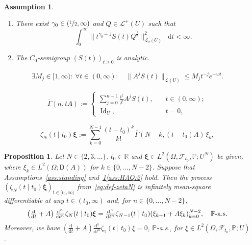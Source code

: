 \documentclass[10pt,a4paper]{amsart}
\newtheorem{assumption}{Assumption}
\newtheorem{proposition}{Proposition}
\newcommand{\bbP}{\mathbb{P}}
\newcommand{\bbR}{\mathbb{R}}
\newcommand{\cF}{\mathcal{F}}
\newcommand{\id}{\operatorname{Id}}
\newcommand{\norm}[2]{     \| #1       \|_{ #2 }}
\newcommand{\rd}{\mathop{}\!\mathrm{d}}
\begin{document}
\begin{assumption}\label{ass:HAQ}
	$\,$
	\begin{enumerate}[leftmargin=1cm]
		\item \label{ass:HAQ:1}
		There exist $\gamma_0 \in (\nicefrac{1}{2}, \infty)$ and $Q \in \mathscr L^+(U)$ such that
		\[
		\int_0^\infty \| t^{\gamma_0-1} S(t) Q^\frac{1}{2} \|_{\mathscr L_2(U)}^2 \rd t < \infty.
		\]
		\item \label{ass:HAQ:2}
		The $C_0$-semigroup
		$(S(t))_{t\ge0}$ is analytic.
	\end{enumerate}
\end{assumption}

\begin{equation}\label{eq:analytic-semigroup-est}
	\exists M_j \in [1,\infty) \colon \: \forall t \in (0,\infty) : \quad
	\norm{A^j S(t)}{\mathscr L(U)} \le M_j t^{-j} e^{-wt}.
\end{equation}

\begin{equation}\label{eq:def-incgamma}
	\begin{aligned}
		\overline\Gamma(n, tA) 
		:= 
		\begin{cases}
			\sum_{j=0}^{n-1} \frac{t^j}{j!} A^j S(t), \quad &t \in (0,\infty); \\
			\id_U, \quad &t = 0,
		\end{cases}
	\end{aligned}
\end{equation}

	\begin{equation}\label{eq:def-zetaN}
		\zeta_{N}(t \mid t_0)\bm\xi 
		:= 
		\sum_{k=0}^{N-1} \frac{(t-t_0)^k}{k!}
		\overline\Gamma(N-k, (t-t_0)A)\, \xi_k,
	\end{equation}

\begin{proposition}\label{prop:recurrence-zeta}
	Let $N \in \{2,3,\dots\}$, $t_0 \in \bbR$ and $\bm\xi \in L^2(\Omega, \cF_{t_0},\bbP; U^{N})$
	be given,
	where $\xi_k \in L^2(\Omega; \mathsf D(A))$ for $k \in \{0, \dots,  N-2\}$.
	Suppose that Assumptions~\textup{\ref{ass:standing} and~\ref{ass:HAQ}\ref{ass:HAQ:2}} hold.
	Then the process $(\zeta_{N}(t \mid t_0)\bm{\xi})_{t \in [t_0,\infty)}$ from~\eqref{eq:def-zetaN}
	is infinitely mean-square differentiable at any $t \in (t_0, \infty)$
	and, for $n \in \{0,\dots,N-2\}$,
	\begin{equation}\label{eq:recurrence-zeta}
		\left(\tfrac{\mathrm d}{\mathrm dt} + A\right)\tfrac{\mathrm d^n}{\mathrm dt^n}
		\zeta_{N}(t \mid t_0) \bm \xi
		= 
		\tfrac{\mathrm d^n}{\mathrm dt^n} \zeta_{N-1}(t \bigm\vert t_0)(\xi_{k+1} + A\xi_{k})_{k=0}^{N-2},
		\quad
		\bbP\text{-a.s.}
	\end{equation}
	Moreover, we have $\left(\tfrac{\mathrm d}{\mathrm dt} + A\right) \tfrac{\mathrm d^n}{\mathrm dt^n} \zeta_{1}(t \mid t_0)\xi 
	= 
	0$, $\bbP$-a.s.,
	for $\xi \in L^2(\Omega, \cF_{t_0}, \bbP; U)$.
\end{proposition}
\end{document}
